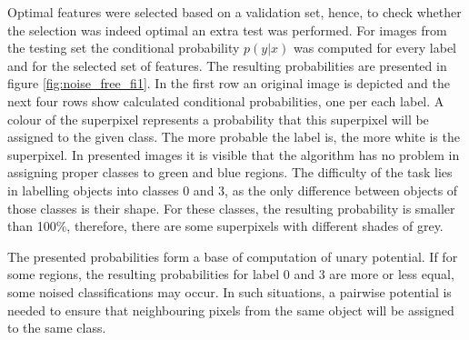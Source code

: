 Optimal features were selected based on a validation set, hence, to check whether the selection was indeed optimal an extra test was performed. For images from the testing set the conditional probability $p(y|x)$ was computed for every label and for the selected set of features. The resulting probabilities are presented in figure \ref{fig:noise_free_fi1}.
In the first row an original image is depicted and the next four rows show calculated conditional probabilities, one per each label. A colour of the superpixel represents a probability that this superpixel will be assigned to the given class. The more probable the label is, the more white is the superpixel. In presented images it is visible that the algorithm has no problem in assigning proper classes to green and blue regions. The difficulty of the task lies in labelling objects into classes 0 and 3, as the only difference between objects of those classes is their shape. For these classes, the resulting probability is smaller than 100\%, therefore, there are some superpixels with different shades of grey. 

The presented probabilities form a base of computation of unary potential. If for some regions, the resulting probabilities for label 0 and 3 are more or less equal, some noised classifications may occur. In such situations, a pairwise potential is needed to ensure that neighbouring pixels from the same object will be assigned to the same class.

